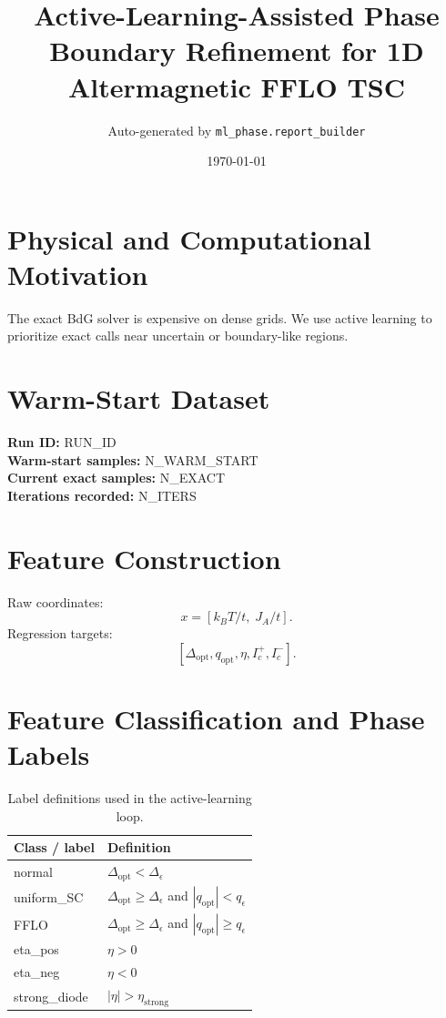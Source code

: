 \documentclass[11pt]{article}
\title{Active-Learning-Assisted Phase Boundary Refinement for 1D Altermagnetic FFLO TSC}
\author{Auto-generated by \texttt{ml\_phase.report\_builder}}
\date{\today}
\begin{document}
\maketitle

\section{Physical and Computational Motivation}
The exact BdG solver is expensive on dense grids. We use active learning to prioritize exact calls near uncertain or boundary-like regions.

\section{Warm-Start Dataset}
\textbf{Run ID:} {{RUN_ID}}\\
\textbf{Warm-start samples:} {{N_WARM_START}}\\
\textbf{Current exact samples:} {{N_EXACT}}\\
\textbf{Iterations recorded:} {{N_ITERS}}

\section{Feature Construction}
Raw coordinates:
\[
x = [k_B T / t,\; J_A/t].
\]
Regression targets:
\[
[\Delta_{\mathrm{opt}}, q_{\mathrm{opt}}, \eta, I_c^+, I_c^-].
\]

\section{Feature Classification and Phase Labels}
\begin{table}[H]
\centering
\begin{tabular}{ll}
\toprule
Class / label & Definition \\
\midrule
normal & $\Delta_{\mathrm{opt}} < \Delta_{\epsilon}$ \\
uniform\_SC & $\Delta_{\mathrm{opt}} \ge \Delta_{\epsilon}$ and $|q_{\mathrm{opt}}| < q_{\epsilon}$ \\
FFLO & $\Delta_{\mathrm{opt}} \ge \Delta_{\epsilon}$ and $|q_{\mathrm{opt}}| \ge q_{\epsilon}$ \\
eta\_pos & $\eta > 0$ \\
eta\_neg & $\eta < 0$ \\
strong\_diode & $|\eta| > \eta_{\mathrm{strong}}$ \\
\bottomrule
\end{tabular}
\caption{Label definitions used in the active-learning loop.}
\end{table}
\end{document}
